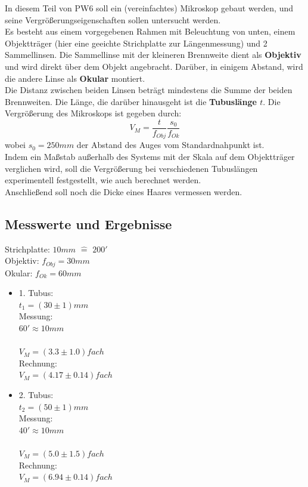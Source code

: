 \documentclass[12pt,a4paper]{article}
\begin{document}
\begin{multicols}{2}
In diesem Teil von PW6 soll ein (vereinfachtes) Mikroskop gebaut werden, und seine Vergrößerungseigenschaften sollen untersucht werden.\\
Es besteht aus einem vorgegebenen Rahmen mit Beleuchtung von unten, einem Objektträger (hier eine geeichte Strichplatte zur Längenmessung) und 2 Sammellinsen. Die Sammellinse mit der kleineren Brennweite dient als \textbf{Objektiv} und wird direkt über dem Objekt angebracht. Darüber, in einigem Abstand, wird die andere Linse als \textbf{Okular} montiert.\\
Die Distanz zwischen beiden Linsen beträgt mindestens die Summe der beiden Brennweiten. Die Länge, die darüber hinausgeht ist die \textbf{Tubuslänge $t$}.
Die Vergrößerung des Mikroskops ist gegeben durch:
$$V_M=\frac{t}{f_{Obj}}\frac{s_0}{f_{Ok}}$$
wobei $s_0=250mm$ der Abstand des Auges vom Standardnahpunkt ist.\\
Indem ein Maßstab außerhalb des Systems mit der Skala auf dem Objektträger verglichen wird, soll die Vergrößerung bei verschiedenen Tubuslängen experimentell festgestellt, wie auch berechnet werden.\\
Anschließend soll noch die Dicke eines Haares vermessen werden.


\subsection{Messwerte und Ergebnisse}

Strichplatte: $10mm$ $\widehat{=}$ $200'$\\
Objektiv: $f_{Obj}=30mm$\\
Okular: $f_{Ok}=60mm$\\

\begin{itemize}

	\item 1. Tubus:\\
	$t_1=(30 \pm 1) mm$\\
	Messung:\\
	$60' \approx 10mm$\\
	\\
	$V_M= (3.3 \pm 1.0)fach$\\
	Rechnung: \\
	$V_M=(4.17\pm 0.14)fach$
	
	\item 2. Tubus:\\
	$t_2=(50 \pm 1) mm$\\
	Messung:\\
	$40' \approx 10mm$\\
	\\
	$V_M= (5.0 \pm 1.5)fach$\\
	Rechnung: \\
	$V_M=(6.94 \pm 0.14)fach$
	

\end{itemize}
\end{multicols}
\end{document}

